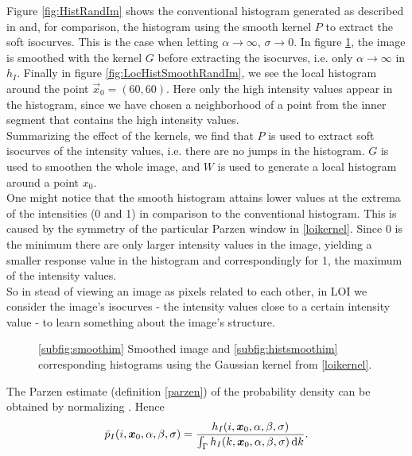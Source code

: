 Figure \ref{fig:HistRandIm} shows the conventional histogram generated as described in  and, for comparison, the histogram using the smooth kernel $P$ to extract the soft isocurves. This is the case when letting $\alpha\to \infty$, $\sigma\to 0$. In figure \ref{fig:HistSmoothRandIm}, the image is smoothed with the kernel $G$ before extracting the isocurves, i.e. only $\alpha\to\infty$ in $h_I$. Finally in figure \ref{fig:LocHistSmoothRandIm}, we see the local histogram around the point $\vec{x}_0 = (60,60)$. Here only the high intensity values appear in the histogram, since we have chosen a neighborhood of a point from the inner segment that contains the high intensity values.\\
Summarizing the effect of the kernels, we find that $P$ is used to extract soft isocurves of the intensity values, i.e. there are no jumps in the histogram. $G$ is used to smoothen the whole image, and $W$ is used to generate a local histogram around a point $x_0$.\\
One might notice that the smooth histogram attains lower values at the extrema of the intensities (0 and 1) in comparison to the conventional histogram. This is caused by the symmetry of the particular Parzen window in \eqref{loikernel}. Since 0 is the minimum there are only larger intensity values in the image, yielding a smaller response value in the histogram and correspondingly for 1, the maximum of the intensity values.\\
So in stead of viewing an image as pixels related to each other, in LOI we consider the image's isocurves - the intensity values close to a certain intensity value - to learn something about the image's structure.

\begin{figure}
  \centering
  \quad
  \caption{\ref{subfig:smoothim} Smoothed image and \ref{subfig:histsmoothim} corresponding histograms using the Gaussian kernel from \eqref{loikernel}.}\label{fig:HistSmoothRandIm}
\end{figure}

The Parzen estimate (definition \ref{parzen}) of the probability density can be obtained by normalizing \cite{dar.11}. Hence
\begin{equation}
\bar{p}_I(i,\boldsymbol{x} _0,\alpha,\beta,\sigma) = \frac{h_I(i,\boldsymbol{x} _0,\alpha,\beta,\sigma)}{\int_\Gamma h_I(k,\boldsymbol{x} _0,\alpha,\beta,\sigma)\,{\rm d} k}.
\end{equation}


